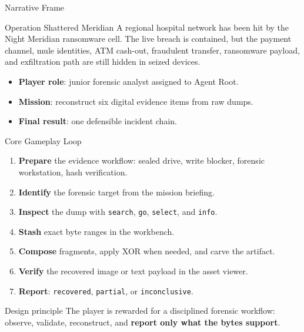 \documentclass[aspectratio=169]{beamer}
\begin{document}
\begin{frame}{Narrative Frame}
  \begin{block}{Operation Shattered Meridian}
    A regional hospital network has been hit by the Night Meridian ransomware cell.
    The live breach is contained, but the payment channel, mule identities, ATM cash-out,
    fraudulent transfer, ransomware payload, and exfiltration path are still hidden in
    seized devices.
  \end{block}

  \vspace{0.2cm}
  \begin{itemize}
    \item \textbf{Player role}: junior forensic analyst assigned to Agent Root.
    \item \textbf{Mission}: reconstruct six digital evidence items from raw dumps.
    \item \textbf{Final result}: one defensible incident chain.
  \end{itemize}
\end{frame}

\begin{frame}{Core Gameplay Loop}
  \begin{enumerate}
    \item \textbf{Prepare} the evidence workflow: sealed drive, write blocker,
      forensic workstation, hash verification.
    \item \textbf{Identify} the forensic target from the mission briefing.
    \item \textbf{Inspect} the dump with \texttt{search}, \texttt{go}, \texttt{select}, and \texttt{info}.
    \item \textbf{Stash} exact byte ranges in the workbench.
    \item \textbf{Compose} fragments, apply XOR when needed, and carve the artifact.
    \item \textbf{Verify} the recovered image or text payload in the asset viewer.
    \item \textbf{Report}: \texttt{recovered}, \texttt{partial}, or \texttt{inconclusive}.
  \end{enumerate}

  \vspace{0.2cm}
  \begin{block}{Design principle}
    The player is rewarded for a disciplined forensic workflow: observe, validate,
    reconstruct, and \textbf{report only what the bytes support}.
  \end{block}
\end{frame}
\end{document}
